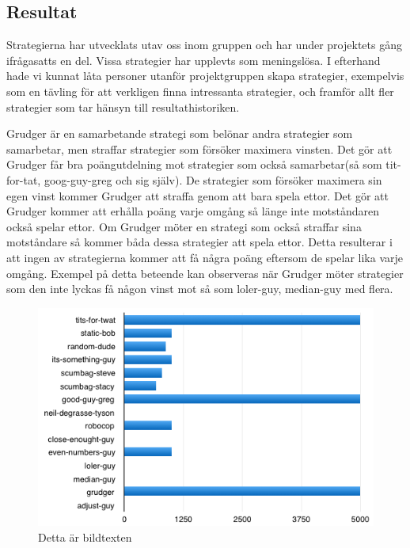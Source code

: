 \subsection{Resultat}
Strategierna har utvecklats utav oss inom gruppen och har under projektets gång ifrågasatts en del. Vissa strategier har upplevts som meningslösa. I efterhand hade vi kunnat låta personer utanför projektgruppen skapa strategier, exempelvis som en tävling för att verkligen finna intressanta strategier, och framför allt fler strategier som tar hänsyn till resultathistoriken.

Grudger är en samarbetande strategi som belönar andra strategier som samarbetar, men straffar strategier som försöker maximera vinsten. Det gör att Grudger får bra poängutdelning mot strategier som också samarbetar(så som tit-for-tat, goog-guy-greg och sig själv). De strategier som försöker maximera sin egen vinst kommer Grudger att straffa genom att bara spela ettor. Det gör att Grudger kommer att erhålla poäng varje omgång så länge inte motståndaren också spelar ettor.  Om Grudger möter en strategi som också straffar sina motståndare så kommer båda dessa strategier att spela ettor. Detta resulterar i att ingen av strategierna kommer att få några poäng eftersom de spelar lika varje omgång. Exempel på detta beteende kan observeras när Grudger möter strategier som den inte lyckas få någon vinst mot så som loler-guy, median-guy med flera.

\begin{figure}[H]
	\begin{center}
	\includegraphics[scale=0.75, angle=0]{bilder/grudger.png}
	\caption{Detta är bildtexten}
	\label{grudger}
	\end{center}
\end{figure}

